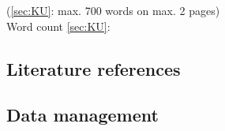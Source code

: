 


\vfill
\vspace{\baselineskip}
(\ref{sec:KU}: max. 700 words on max. 2 pages)\\

Word count \ref{sec:KU}:


\newpage
\subsection{Literature references}\label{sec:ref}

\newrefcontext[sorting=nyt]
\printbibliography[heading=none,notcategory=fullcited]


\newpage
\subsection{Data management}\label{sec:dataman}


